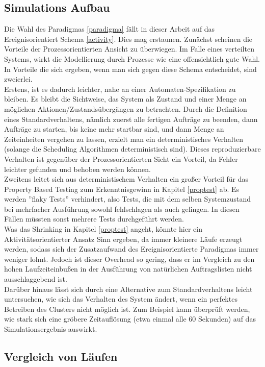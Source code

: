 \subsection{Simulations Aufbau}
Die Wahl des Paradigmas \ref{paradigma} fällt in dieser Arbeit auf das Ereignisorientiert Schema \ref{activity}. Dies mag erstaunen. Zunächst scheinen die Vorteile der Prozessorientierten Ansicht zu überwiegen. Im Falle eines verteilten Systems, wirkt die Modellierung durch Prozesse wie eine offensichtlich gute Wahl.
In Vorteile die sich ergeben, wenn man sich gegen diese Schema entscheidet, sind zweierlei.\\
Erstens, ist es dadurch leichter, nahe an einer Automaten-Spezifikation zu bleiben. Es bleibt die Sichtweise, das System als Zustand und einer Menge an möglichen Aktionen/Zustandsübergängen zu betrachten. Durch die Definition eines Standardverhaltens, nämlich zuerst alle fertigen Aufträge zu beenden, dann Aufträge zu starten, bis keine mehr startbar sind, und dann Menge an Zeiteinheiten vergehen zu lassen, erzielt man ein deterministisches Verhalten (solange die Scheduling Algorithmen deterministisch sind). Dieses reproduzierbare Verhalten ist gegenüber der Prozessorientierten Sicht ein Vorteil, da Fehler leichter gefunden und behoben werden können.\\
Zweitens leitet sich aus deterministischem Verhalten ein großer Vorteil für das Property Based Testing zum Erkenntnisgewinn in Kapitel \ref{proptest} ab.
Es werden ''flaky Tests'' verhindert, also Tests, die mit dem selben Systemzustand bei mehrfacher Ausführung sowohl fehlschlagen als auch gelingen. In diesen Fällen müssten sonst mehrere Tests durchgeführt werden.\\
Was das Shrinking in Kapitel \ref{proptest} angeht, könnte hier ein  Aktivitätsorientierter Ansatz Sinn ergeben, da immer kleinere Läufe erzeugt werden, sodass sich der Zusatzaufwand des Ereignisorientierte Paradigmas immer weniger lohnt. Jedoch ist dieser Overhead so gering, dass er im Vergleich zu den hohen Laufzeiteinbußen in der Ausführung von natürlichen Auftragslisten nicht ausschlaggebend ist.\\
Darüber hinaus lässt sich durch eine Alternative zum Standardverhaltens leicht untersuchen, wie sich das Verhalten des System ändert, wenn ein perfektes Betreiben des Clusters nicht möglich ist. Zum Beispiel kann überprüft werden, wie stark sich eine gröbere Zeitauflösung (etwa einmal alle 60 Sekunden) auf das Simulationsergebnis auswirkt. 


\subsection{Vergleich von Läufen}
\label{vergleich}
